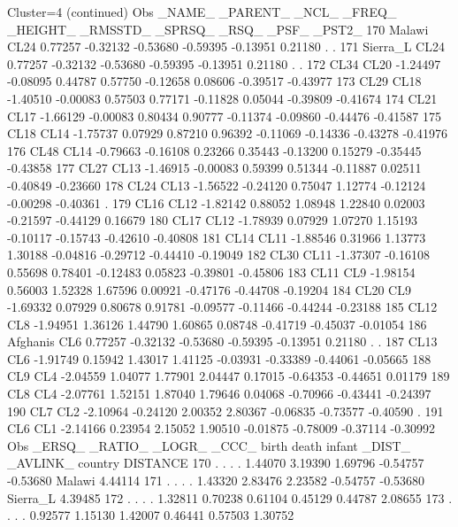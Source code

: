 \documentclass{article}
\begin{document}
\begin{Woutput}
Cluster=4
(continued)
Obs _NAME_   _PARENT_   _NCL_   _FREQ_  _HEIGHT_ _RMSSTD_  _SPRSQ_   _RSQ_    _PSF_   _PST2_
170 Malawi     CL24    0.77257 -0.32132 -0.53680 -0.59395 -0.13951  0.21180   .        .
171 Sierra_L   CL24    0.77257 -0.32132 -0.53680 -0.59395 -0.13951  0.21180   .        .
172 CL34       CL20   -1.24497 -0.08095  0.44787  0.57750 -0.12658  0.08606 -0.39517 -0.43977
173 CL29       CL18   -1.40510 -0.00083  0.57503  0.77171 -0.11828  0.05044 -0.39809 -0.41674
174 CL21       CL17   -1.66129 -0.00083  0.80434  0.90777 -0.11374 -0.09860 -0.44476 -0.41587
175 CL18       CL14   -1.75737  0.07929  0.87210  0.96392 -0.11069 -0.14336 -0.43278 -0.41976
176 CL48       CL14   -0.79663 -0.16108  0.23266  0.35443 -0.13200  0.15279 -0.35445 -0.43858
177 CL27       CL13   -1.46915 -0.00083  0.59399  0.51344 -0.11887  0.02511 -0.40849 -0.23660
178 CL24       CL13   -1.56522 -0.24120  0.75047  1.12774 -0.12124 -0.00298 -0.40361   .
179 CL16       CL12   -1.82142  0.88052  1.08948  1.22840  0.02003 -0.21597 -0.44129  0.16679
180 CL17       CL12   -1.78939  0.07929  1.07270  1.15193 -0.10117 -0.15743 -0.42610 -0.40808
181 CL14       CL11   -1.88546  0.31966  1.13773  1.30188 -0.04816 -0.29712 -0.44410 -0.19049
182 CL30       CL11   -1.37307 -0.16108  0.55698  0.78401 -0.12483  0.05823 -0.39801 -0.45806
183 CL11       CL9    -1.98154  0.56003  1.52328  1.67596  0.00921 -0.47176 -0.44708 -0.19204
184 CL20       CL9    -1.69332  0.07929  0.80678  0.91781 -0.09577 -0.11466 -0.44244 -0.23188
185 CL12       CL8    -1.94951  1.36126  1.44790  1.60865  0.08748 -0.41719 -0.45037 -0.01054
186 Afghanis   CL6     0.77257 -0.32132 -0.53680 -0.59395 -0.13951  0.21180   .        .
187 CL13       CL6    -1.91749  0.15942  1.43017  1.41125 -0.03931 -0.33389 -0.44061 -0.05665
188 CL9        CL4    -2.04559  1.04077  1.77901  2.04447  0.17015 -0.64353 -0.44651  0.01179
189 CL8        CL4    -2.07761  1.52151  1.87040  1.79646  0.04068 -0.70966 -0.43441 -0.24397
190 CL7        CL2    -2.10964 -0.24120  2.00352  2.80367 -0.06835 -0.73577 -0.40590   .
191 CL6        CL1    -2.14166  0.23954  2.15052  1.90510 -0.01875 -0.78009 -0.37114 -0.30992
Obs  _ERSQ_  _RATIO_  _LOGR_  _CCC_    birth    death   infant   _DIST_  _AVLINK_ country  DISTANCE
170  .        .       .       .       1.44070  3.19390  1.69796 -0.54757 -0.53680 Malawi    4.44114
171  .        .       .       .       1.43320  2.83476  2.23582 -0.54757 -0.53680 Sierra_L  4.39485
172  .        .       .       .       1.32811  0.70238  0.61104  0.45129  0.44787           2.08655
173  .        .       .       .       0.92577  1.15130  1.42007  0.46441  0.57503           1.30752

\end{Woutput}
\end{document}
